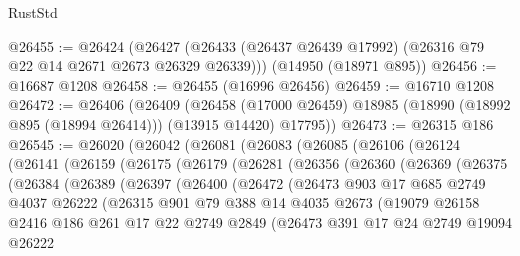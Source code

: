 \begin{lexlean}{RustStd}
\begin{coremodule}
@26455 := @26424
    (@26427 (@26433 (@26437 @26439 @17992) (@26316 @79 @22 @14 @2671 @2673 @26329 @26339)))
    (@14950 (@18971 @895))
@26456 := @16687 @1208
@26458 := @26455 (@16996 @26456)
@26459 := @16710 @1208
@26472 := @26406
    (@26409
      (@26458 (@17000 @26459) @18985 (@18990 (@18992 @895 (@18994 @26414))) (@13915 @14420) @17795))
@26473 := @26315 @186
@26545 := @26020
    (@26042
      (@26081
        (@26083
          (@26085
            (@26106
              (@26124
                (@26141
                  (@26159
                    (@26175
                      (@26179
                        (@26281
                          (@26356
                            (@26360
                              (@26369
                                (@26375
                                  (@26384
                                    (@26389
                                      (@26397
                                        (@26400
                                          (@26472
                                            (@26473
                                              @903
                                              @17
                                              @685
                                              @2749
                                              @4037
                                              @26222
                                              (@26315
                                                @901
                                                @79
                                                @388
                                                @14
                                                @4035
                                                @2673
                                                (@19079
                                                  @26158
                                                  @2416
                                                  @186
                                                  @261
                                                  @17
                                                  @22
                                                  @2749
                                                  @2849
                                                  (@26473
                                                    @391
                                                    @17
                                                    @24
                                                    @2749
                                                    @19094
                                                    @26222

\end{coremodule}
\end{lexlean}
